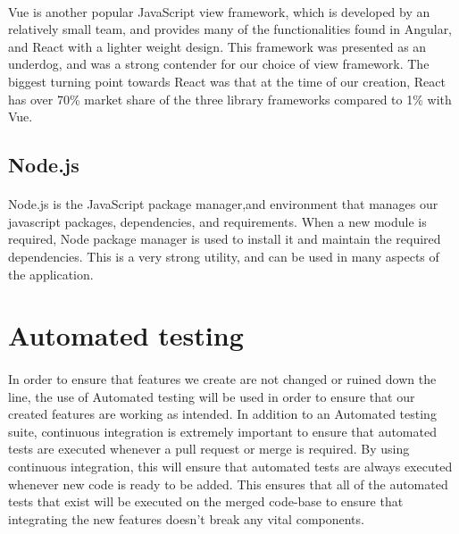 \documentclass[12pt]{article}
\begin{document}
	\paragraph{}
		Vue is another popular JavaScript view framework, which is developed by an relatively small team, and provides many of the functionalities found in Angular, and React with a lighter weight design. This framework was presented as an underdog, and was a strong contender for our choice of view framework. The biggest turning point towards React was that at the time of our creation, React has over 70\% market share of the three library frameworks compared to 1\% with Vue. 
	
	\subsection{Node.js}
	\paragraph{}
		Node.js is the JavaScript package manager,and environment that manages our javascript packages, dependencies, and requirements. When a new module is required, Node package manager is used to install it and maintain the required dependencies. This is a very strong utility, and can be used in many aspects of the application. 




\newpage

\section{Automated testing}
\paragraph{}
	In order to ensure that features we create are not changed or ruined down the line, the use of Automated testing will be used in order to ensure that our created features are working as intended. In addition to an Automated testing suite, continuous integration is extremely important to ensure that automated tests are executed whenever a pull request or merge is required. By using continuous integration, this will ensure that automated tests are always executed whenever new code is ready to be added. This ensures that all of the automated tests that exist will be executed on the merged code-base to ensure that integrating the new features doesn't break any vital components.
\end{document}
